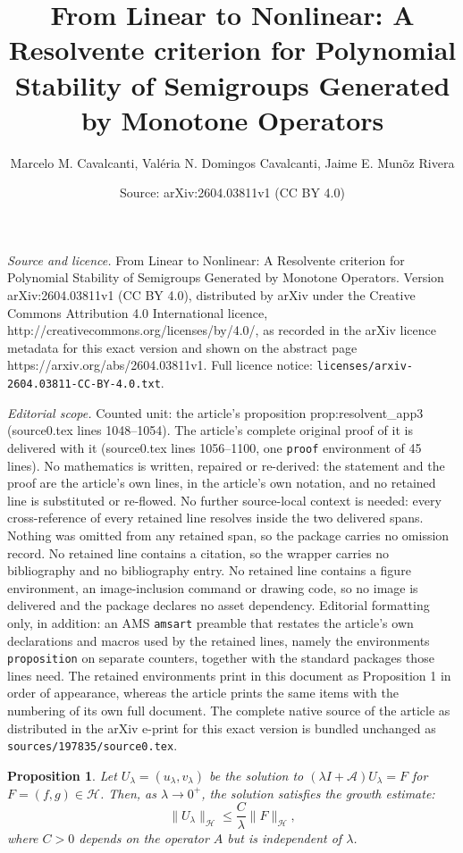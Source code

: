 \documentclass[10pt,a4paper]{amsart}
\title{From Linear to Nonlinear: A Resolvente criterion for Polynomial Stability of Semigroups Generated by Monotone Operators}
\author{Marcelo M. Cavalcanti, Val\'eria N. Domingos Cavalcanti, Jaime E. Mun\~oz Rivera}
\date{Source: arXiv:2604.03811v1 (CC BY 4.0)}
\newtheorem{proposition}{Proposition}
\begin{document}
\maketitle

\noindent\emph{Source and licence.} From Linear to Nonlinear: A Resolvente criterion for Polynomial Stability of Semigroups Generated by Monotone Operators. Version arXiv:2604.03811v1 (CC BY 4.0), distributed by arXiv under the Creative Commons Attribution 4.0 International licence, http://creativecommons.org/licenses/by/4.0/, as recorded in the arXiv licence metadata for this exact version and shown on the abstract page https://arxiv.org/abs/2604.03811v1. Full licence notice: \texttt{licenses/arxiv-2604.03811-CC-BY-4.0.txt}.\par\smallskip

\noindent\textit{Editorial scope.} Counted unit: the article's proposition prop:resolvent\_app3 (source0.tex lines 1048--1054). The article's complete original proof of it is delivered with it (source0.tex lines 1056--1100, one \texttt{proof} environment of 45 lines). No mathematics is written, repaired or re-derived: the statement and the proof are the article's own lines, in the article's own notation, and no retained line is substituted or re-flowed.  No further source-local context is needed: every cross-reference of every retained line resolves inside the two delivered spans.  Nothing was omitted from any retained span, so the package carries no omission record.  No retained line contains a citation, so the wrapper carries no bibliography and no bibliography entry.  No retained line contains a figure environment, an image-inclusion command or drawing code, so no image is delivered and the package declares no asset dependency.  Editorial formatting only, in addition: an AMS \texttt{amsart} preamble that restates the article's own declarations and macros used by the retained lines, namely the environments \texttt{proposition} on separate counters, together with the standard packages those lines need.  The retained environments print in this document as Proposition 1 in order of appearance, whereas the article prints the same items with the numbering of its own full document.  The complete native source of the article as distributed in the arXiv e-print for this exact version is bundled unchanged as \texttt{sources/197835/source0.tex}.
\begin{proposition}\label{prop:resolvent_app3}
Let $U_\lambda=(u_\lambda, v_\lambda)$ be the solution to $(\lambda I + \mathcal{A})U_\lambda = F$ for $F=(f,g) \in \mathcal{H}$. Then, as $\lambda \to 0^+$, the solution satisfies the growth estimate:
\[
\|U_\lambda\|_{\mathcal H} \le \frac{C}{\lambda} \|F\|_{\mathcal H},
\]
where $C > 0$ depends on the operator $A$ but is independent of $\lambda$.
\end{proposition}
\end{document}
